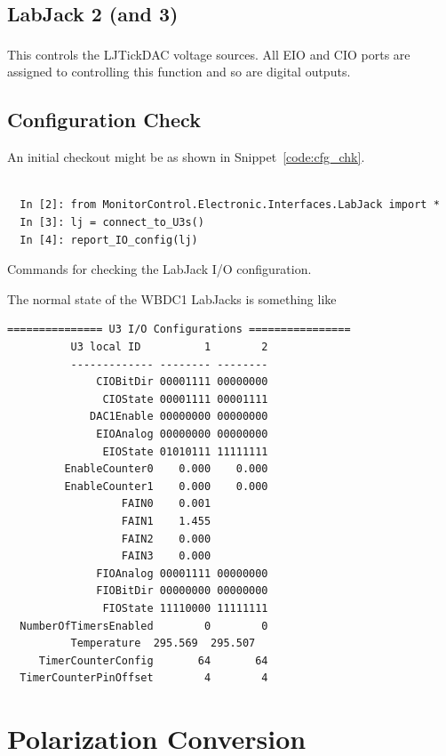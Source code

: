 \documentclass[letterpaper,11pt]{book}
\begin{document}
\section{LabJack 2 (and 3)}

This controls the LJTickDAC\textsuperscript{\textregistered} voltage sources.
All EIO and CIO ports are assigned to controlling this function and so are
digital outputs.

\section{Configuration Check}\label{sec:cfg_chk}

An initial checkout might be as shown in Snippet~\ref{code:cfg_chk}.
\begin{code}[h!tb]
\begin{center}
\begin{verbatim}

  In [2]: from MonitorControl.Electronic.Interfaces.LabJack import *
  In [3]: lj = connect_to_U3s()
  In [4]: report_IO_config(lj)\end{verbatim}
\caption{\label{code:cfg_chk}Commands for checking the LabJack I/O
configuration.}
\end{center}
\end{code}
The normal state of the WBDC1 LabJacks is something like
\begin{verbatim}
=============== U3 I/O Configurations ================
          U3 local ID          1        2
          ------------- -------- --------
              CIOBitDir 00001111 00000000
               CIOState 00001111 00001111
             DAC1Enable 00000000 00000000
              EIOAnalog 00000000 00000000
               EIOState 01010111 11111111
         EnableCounter0    0.000    0.000
         EnableCounter1    0.000    0.000
                  FAIN0    0.001
                  FAIN1    1.455
                  FAIN2    0.000
                  FAIN3    0.000
              FIOAnalog 00001111 00000000
              FIOBitDir 00000000 00000000
               FIOState 11110000 11111111
  NumberOfTimersEnabled        0        0
          Temperature  295.569  295.507
     TimerCounterConfig       64       64
  TimerCounterPinOffset        4        4
\end{verbatim}

\chapter{Polarization Conversion}\label{app:pol}
\end{document}

